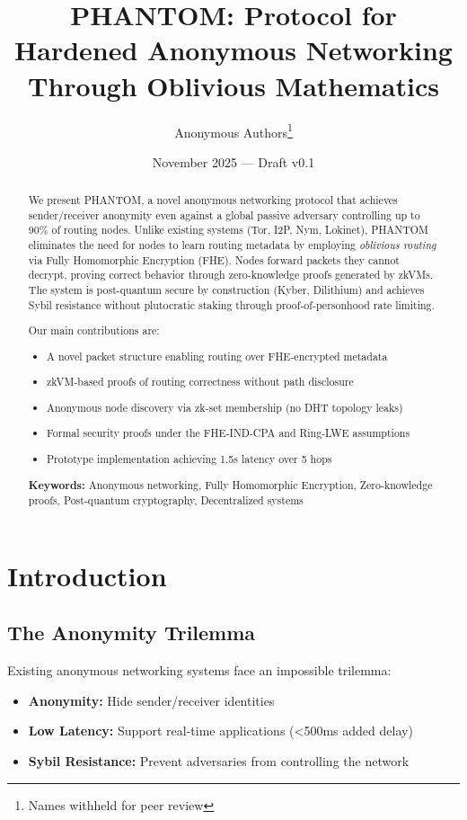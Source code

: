 \documentclass[11pt]{article}
\title{PHANTOM: Protocol for Hardened Anonymous Networking \\Through Oblivious Mathematics}
\author{Anonymous Authors\thanks{Names withheld for peer review}}
\date{November 2025 --- Draft v0.1}
\begin{document}
\maketitle

\begin{abstract}
We present PHANTOM, a novel anonymous networking protocol that achieves sender/receiver anonymity even against a global passive adversary controlling up to 90\% of routing nodes. Unlike existing systems (Tor, I2P, Nym, Lokinet), PHANTOM eliminates the need for nodes to learn routing metadata by employing \emph{oblivious routing} via Fully Homomorphic Encryption (FHE). Nodes forward packets they cannot decrypt, proving correct behavior through zero-knowledge proofs generated by zkVMs. The system is post-quantum secure by construction (Kyber, Dilithium) and achieves Sybil resistance without plutocratic staking through proof-of-personhood rate limiting.

Our main contributions are:
\begin{itemize}
\item A novel packet structure enabling routing over FHE-encrypted metadata
\item zkVM-based proofs of routing correctness without path disclosure
\item Anonymous node discovery via zk-set membership (no DHT topology leaks)
\item Formal security proofs under the FHE-IND-CPA and Ring-LWE assumptions
\item Prototype implementation achieving 1.5s latency over 5 hops
\end{itemize}

\textbf{Keywords:} Anonymous networking, Fully Homomorphic Encryption, Zero-knowledge proofs, Post-quantum cryptography, Decentralized systems
\end{abstract}

\section{Introduction}

\subsection{The Anonymity Trilemma}

Existing anonymous networking systems face an impossible trilemma:

\begin{itemize}
\item \textbf{Anonymity:} Hide sender/receiver identities
\item \textbf{Low Latency:} Support real-time applications (<500ms added delay)
\item \textbf{Sybil Resistance:} Prevent adversaries from controlling the network
\end{itemize}
\end{document}
